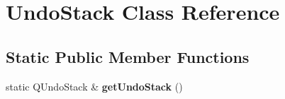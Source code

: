 \hypertarget{classUndoStack}{}\section{Undo\+Stack Class Reference}
\label{classUndoStack}
\subsection*{Static Public Member Functions}
\begin{DoxyCompactItemize}
\item 
\hypertarget{classUndoStack_a89724e3c86a4dc5d51198d844d464d47}{}static Q\+Undo\+Stack \& {\bfseries get\+Undo\+Stack} ()\label{classUndoStack_a89724e3c86a4dc5d51198d844d464d47}

\end{DoxyCompactItemize}
